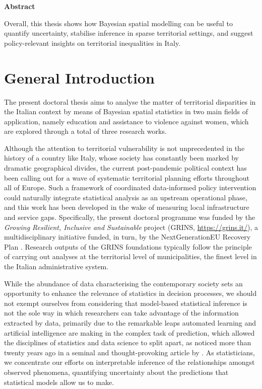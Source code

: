\documentclass[openany, 11pt, oneside]{book}
\newenvironment{thesisabstract}{
  \clearpage
  \phantomsection

  \begin{center}
    {\Large\bfseries Abstract}
  \end{center}
  \vspace{0.6\baselineskip}

  \begingroup
  \small                
  \setstretch{1.05}
  \setlength{\parindent}{1.2em}
  \setlength{\parskip}{0.35em}
  \setlength{\emergencystretch}{2em} %
}{
  \par
  \endgroup
}
\begin{document}
\begin{thesisabstract}
Overall, this thesis shows how Bayesian spatial modelling can be useful to quantify uncertainty, stabilise inference in sparse territorial settings, and suggest policy-relevant insights on territorial inequalities in Italy. 
\end{thesisabstract}


\clearpage
{}
\setcounter{page}{1}
{\small\tableofcontents}

\clearpage


\markboth{}{}





 
\chapter*{General Introduction}

The present doctoral thesis aims to analyse the matter of territorial disparities in the Italian context by means of Bayesian spatial statistics in two main fields of application, namely education and assistance to violence against women, which are explored through a total of three research works.

Although the attention to territorial vulnerability is not unprecedented in the history of a country like Italy, whose society has constantly been marked by dramatic geographical divides, the current post-pandemic political context has been calling out for a wave of systematic territorial planning efforts throughout all of Europe. Such a framework of coordinated data-informed policy intervention could naturally integrate statistical analysis as an upstream operational phase, and this work has been developed in the wake of measuring local infrastructure and service gaps. Specifically, the present doctoral programme was funded by the \textit{Growing Resilient, Inclusive and Sustainable} project (GRINS, \url{https://grins.it/}), a multidisciplinary initiative funded, in turn, by the NextGenerationEU Recovery Plan \parencite{CrescenziEtAl2021, DeLaPorteJensen2021}. Research outputs of the GRINS foundations typically follow the principle of carrying out analyses at the territorial level of municipalities, the finest level in the Italian administrative system.
 
While the abundance of data characterising the contemporary society sets an opportunity to enhance the relevance of statistics in decision processes, we should not exempt ourselves from considering that model-based statistical inference is not the sole way in which researchers can take advantage of the information extracted by data, primarily due to the remarkable leaps automated learning and artificial intelligence are making in the complex task of prediction, which allowed the disciplines of statistics and data science to split apart, as noticed more than twenty years ago in a seminal and thought-provoking article by \textcite{Breiman}. As statisticians, we concentrate our efforts on interpretable inference of the relationships amongst observed phenomena, quantifying uncertainty about the predictions that statistical models allow us to make.
\end{document}
